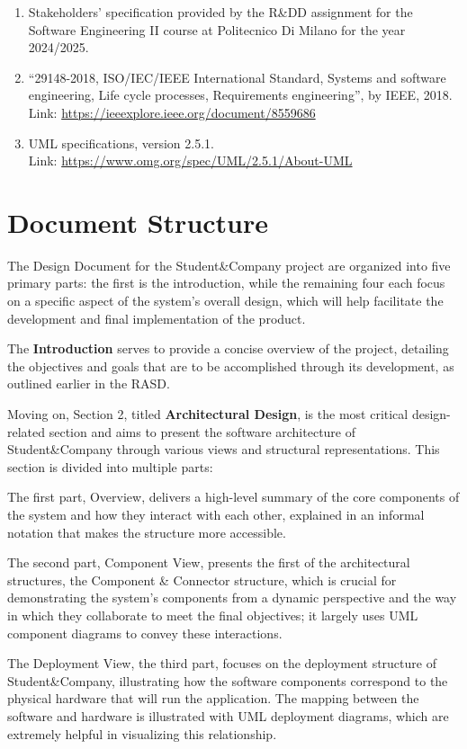 \begin{enumerate}
    \item Stakeholders’ specification provided by the R\&DD assignment for the Software Engineering II course at Politecnico Di Milano for the year 2024/2025.
    \item ``29148-2018, ISO/IEC/IEEE International Standard, Systems and software engineering, Life cycle processes, Requirements engineering'', by IEEE, 2018. \\
    Link: \url{https://ieeexplore.ieee.org/document/8559686}
    \item UML specifications, version 2.5.1. \\
    Link: \url{https://www.omg.org/spec/UML/2.5.1/About-UML}
\end{enumerate}

\newpage
\section{Document Structure}
The Design Document for the Student\&Company project are organized into five primary parts: the first
is the introduction, while the remaining four each focus on a specific aspect of the system's overall design,
which will
help facilitate the development and final implementation of the product.

The \textbf{Introduction} serves to
provide a concise overview of the project, detailing the objectives and goals that are to be accomplished
through its development, as outlined earlier in the RASD.

Moving on, Section 2, titled \textbf{Architectural Design},
is the most critical design-related section and aims to present the software architecture of Student\&Company
through various views and structural representations. This section is divided into multiple parts: 

The first part, Overview, delivers a high-level summary of the core components of the system and how
they interact with each other, explained in an informal notation that makes the structure more accessible.

The second part, Component View, presents the first of the architectural structures, the Component \&
Connector structure, which is crucial for demonstrating the system’s components from a dynamic perspective
and the way in which they collaborate to meet the final objectives; it largely uses UML component diagrams
to convey these interactions.

The Deployment View, the third part, focuses on the deployment structure of
Student\&Company, illustrating how the software components correspond to the physical hardware that will
run the application. The mapping between the software and hardware is illustrated with UML deployment
diagrams, which are extremely helpful in visualizing this relationship.

